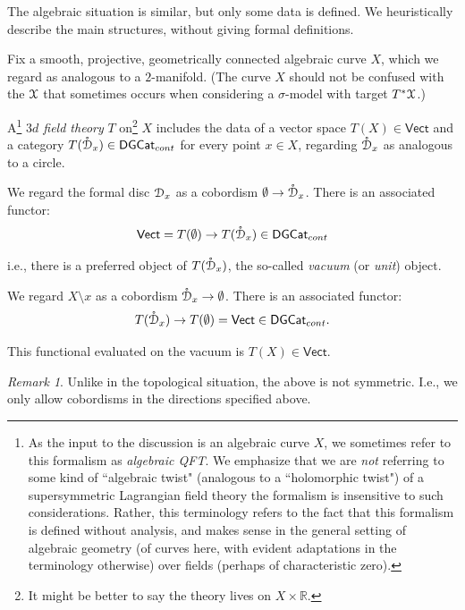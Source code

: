 \documentclass[reqno,11pt]{amsart}
\numberwithin{equation}{subsection}
\theoremstyle{remark}
\newtheorem{rem}[thm]{Remark}
\newcommand{\bR}{{\mathbb R}}
\newcommand{\sD}{{\EuScript D}}
\newcommand{\sX}{{\EuScript X}}
\newcommand{\Vect}{\mathsf{Vect}}
\newcommand{\DGCat}{\mathsf{DGCat}}
\renewcommand{\o}[1]{\mathring{#1}}
\begin{document}
\subsubsection{}\label{ss:alg-3d}

The algebraic situation is similar, but only some data is defined.
We heuristically describe the main structures, without giving formal definitions.

Fix a smooth, projective, geometrically connected algebraic curve $X$,
which we regard as analogous to a $2$-manifold. (The curve $X$ should not be confused
with the $\sX$ that sometimes occurs when considering a $\sigma$-model with 
target $T^*\sX$.)

A\footnote{As the input to the discussion is an algebraic curve $X$,
we sometimes refer to this formalism as \emph{algebraic QFT}.
We emphasize that we are \emph{not} referring to some kind of
``algebraic twist" (analogous to a ``holomorphic twist") 
of a supersymmetric Lagrangian field theory \textemdash{}  the
formalism is insensitive to such considerations. Rather, this
terminology refers to the fact that this formalism is defined without
analysis, and makes sense in the general setting of algebraic geometry (of
curves here, with evident adaptations in the terminology otherwise)
over fields (perhaps of characteristic zero).}
\emph{$3d$ field theory} $T$ on\footnote{It might be better
to say the theory lives on $X \times \bR$.} $X$ includes the
data of a vector space $T(X) \in \Vect$ and a category 
$T(\o{\sD}_x) \in \DGCat_{cont}$ for every point $x \in X$,
regarding $\o{\sD}_x$ as analogous to a circle. 

We regard the formal disc $\sD_x$ as a cobordism
$\emptyset \to \o{\sD}_x$. There is an associated functor:
%
\[
\Vect = T(\emptyset) \to T(\o{\sD}_x) \in \DGCat_{cont} 
\]

\noindent i.e., there is a preferred object of $T(\o{\sD}_x)$,
the so-called \emph{vacuum} (or \emph{unit}) object. 

We regard $X \setminus x$ as a cobordism
$\o{\sD}_x \to \emptyset$. There is an associated functor:
%
\[
T(\o{\sD}_x) \to T(\emptyset) = \Vect \in \DGCat_{cont}.
\]

\noindent This functional evaluated on the vacuum is
$T(X) \in \Vect$.

\begin{rem}

Unlike in the topological situation, the above is not symmetric.
I.e., we only allow cobordisms in the directions specified above.

\end{rem}
\end{document}
